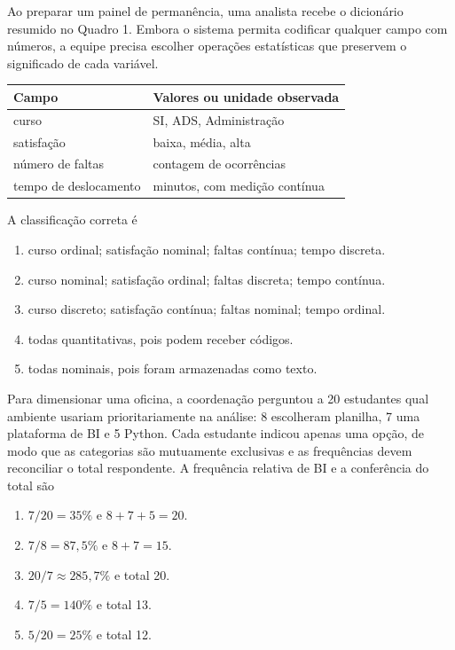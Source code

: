 \TextoBase Ao preparar um painel de permanência, uma analista recebe o dicionário resumido no Quadro 1. Embora o sistema permita codificar qualquer campo com números, a equipe precisa escolher operações estatísticas que preservem o significado de cada variável.
\begin{DocumentBox}
\begin{tabularx}{\textwidth}{@{}YY@{}}\toprule
\textbf{Campo} & \textbf{Valores ou unidade observada}\\\midrule
curso & SI, ADS, Administração\\
satisfação & baixa, média, alta\\
número de faltas & contagem de ocorrências\\
tempo de deslocamento & minutos, com medição contínua\\\bottomrule
\end{tabularx}
\end{DocumentBox}
\FonteDidatica
\Comando A classificação correta é
\begin{enumerate}[label=\Alph*)]\item curso ordinal; satisfação nominal; faltas contínua; tempo discreta.\item curso nominal; satisfação ordinal; faltas discreta; tempo contínua.\item curso discreto; satisfação contínua; faltas nominal; tempo ordinal.\item todas quantitativas, pois podem receber códigos.\item todas nominais, pois foram armazenadas como texto.\end{enumerate}

\TextoBase Para dimensionar uma oficina, a coordenação perguntou a 20 estudantes qual ambiente usariam prioritariamente na análise: 8 escolheram planilha, 7 uma plataforma de BI e 5 Python. Cada estudante indicou apenas uma opção, de modo que as categorias são mutuamente exclusivas e as frequências devem reconciliar o total respondente.
\FonteDidatica
\Comando A frequência relativa de BI e a conferência do total são
\begin{enumerate}[label=\Alph*)]\item $7/20=35\%$ e $8+7+5=20$.\item $7/8=87{,}5\%$ e $8+7=15$.\item $20/7\approx285{,}7\%$ e total 20.\item $7/5=140\%$ e total 13.\item $5/20=25\%$ e total 12.\end{enumerate}

